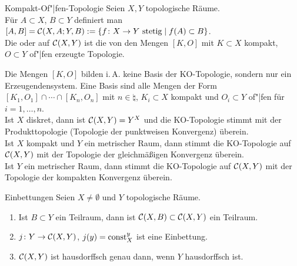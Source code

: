 \linie

\begin{Def}{Kompakt-Of"|fen-Topologie}
    Seien $X, Y$ topologische Räume. \\
    Für $A \subset X$, $B \subset Y$ definiert man
    $[A, B] = \mathcal{C}(X, A; Y, B) := \{f\colon X \rightarrow Y \text{ stetig} \;|\;
    f(A) \subset B\}$. \\
    Die  oder 
    auf $\mathcal{C}(X, Y)$ ist die von
    den Mengen $[K, O]$ mit $K \subset X$ kompakt, $O \subset Y$ of"|fen
    erzeugte Topologie.
\end{Def}

\begin{Bem}
    Die Mengen $[K, O]$ bilden i.\,A. keine Basis der KO-Topologie, sondern
    nur ein Erzeugendensystem.
    Eine Basis sind alle Mengen der Form
    $[K_1, O_1] \cap \dotsb \cap [K_n, O_n]$
    mit $n \in \natural$, $K_i \subset X$ kompakt und $O_i \subset Y$ of"|fen
    für $i = 1, \dotsc, n$. \\
    Ist $X$ diskret, dann ist $\mathcal{C}(X, Y) = Y^X$ und die KO-Topologie
    stimmt mit der Produkttopologie (Topologie der punktweisen Konvergenz)
    überein. \\
    Ist $X$ kompakt und $Y$ ein metrischer Raum, dann stimmt die
    KO-Topologie auf $\mathcal{C}(X, Y)$ mit der
    Topologie der gleichmäßigen Konvergenz überein. \\
    Ist $Y$ ein metrischer Raum, dann stimmt die
    KO-Topologie auf $\mathcal{C}(X, Y)$ mit der
    Topologie der kompakten Konvergenz überein.
\end{Bem}

\linie

\begin{Satz}{Einbettungen}
    Seien $X \not= \emptyset$ und $Y$ topologische Räume.
    \begin{enumerate}
        \item
        Ist $B \subset Y$ ein Teilraum, dann ist
        $\mathcal{C}(X, B) \subset \mathcal{C}(X, Y)$ ein Teilraum.
        
        \item
        $j\colon Y \rightarrow \mathcal{C}(X, Y)$, $j(y) = \operatorname{const}_X^y$ ist eine
        Einbettung.
        
        \item
        $\mathcal{C}(X, Y)$ ist hausdorffsch genau dann, wenn $Y$ hausdorffsch ist.
    \end{enumerate}
\end{Satz}


